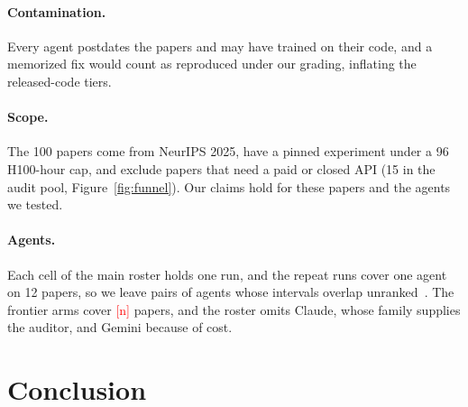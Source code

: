 \documentclass{article} %
\newcommand{\todo}[1]{\textcolor{red}{[#1]}}
\begin{document}
\paragraph{Contamination.} Every agent postdates the papers and may have
trained on their code, and a memorized fix would count as reproduced under our grading, inflating the released-code tiers.

\paragraph{Scope.} The 100 papers come from NeurIPS 2025, have a pinned experiment under a 96 H100-hour cap, and exclude papers that need a paid or closed API (15 in the audit pool, Figure~\ref{fig:funnel}). Our claims hold for these papers and the agents we tested.

\paragraph{Agents.} Each cell of the main roster holds one run, and the repeat
runs cover one agent on 12 papers, so we leave pairs of agents whose intervals
overlap unranked~\citep{bjarnason2026randomness}. The frontier arms cover
\todo{n} papers, and the roster omits Claude, whose family supplies the auditor, and Gemini because of cost.

\section{Conclusion}
\label{sec:conclusion}
\end{document}
